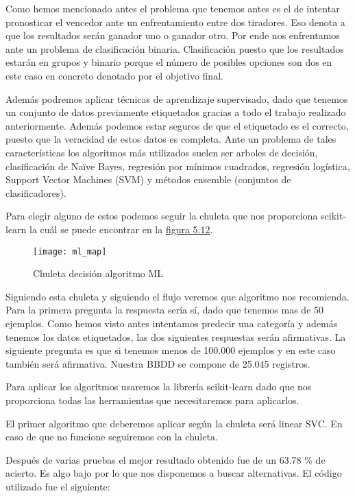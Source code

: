 Como hemos mencionado antes el problema que tenemos antes es el de intentar pronosticar
el vencedor ante un enfrentamiento entre dos tiradores. Eso denota a que los resultados
serán ganador uno o ganador otro. Por ende nos enfrentamos ante un problema de clasificación
binaria. Clasificación puesto que los resultados estarán en grupos y binario porque el número
de posibles opciones son dos en este caso en concreto denotado por el objetivo final.

Además podremos aplicar técnicas de aprendizaje supervisado, dado que tenemos un conjunto de datos
previamente etiquetados gracias a todo el trabajo realizado anteriormente. Además podemos
estar seguros de que el etiquetado es el correcto, puesto que la veracidad de estos datos
es completa. Ante un problema de tales características los algoritmos más utilizados suelen ser
arboles de decisión, clasificación de Naïve Bayes, regresión por mínimos cuadrados, regresión
logística, Support Vector Machines (SVM) y métodos ensemble (conjuntos de clasificadores).

Para elegir alguno de estos podemos seguir la chuleta que nos proporciona scikit-learn la cuál se
puede encontrar en la \hyperref[fig:Chuleta decisión algoritmo ML]{figura 5.12}.

\begin{figure}[htb]
  \centering
    \texttt{[image: ml\_map]}
  \caption[Chuleta decisión algoritmo ML]{Chuleta decisión algoritmo ML}
  \label{fig:Chuleta decisión algoritmo ML}
\end{figure}

Siguiendo esta chuleta y siguiendo el flujo veremos que algoritmo nos recomienda.
Para la primera pregunta la respuesta sería sí, dado que tenemos mas de 50 ejemplos.
Como hemos visto antes intentamos predecir una categoría y además tenemos los datos
etiquetados, las dos siguientes respuestas serán afirmativas. La siguiente pregunta
es que si tenemos menos de 100.000 ejemplos y en este caso también será afirmativa.
Nuestra BBDD se compone de 25.045 registros.

Para aplicar los algoritmos usaremos la librería scikit-learn dado que nos proporciona
todas las herramientas que necesitaremos para aplicarlos.

El primer algoritmo que deberemos aplicar según la chuleta será linear SVC. En caso
de que no funcione seguiremos con la chuleta.

Después de varias pruebas el mejor resultado obtenido fue de un 63.78 \% de acierto. Es
algo bajo por lo que nos disponemos a buscar alternativas. El código utilizado fue el siguiente:

